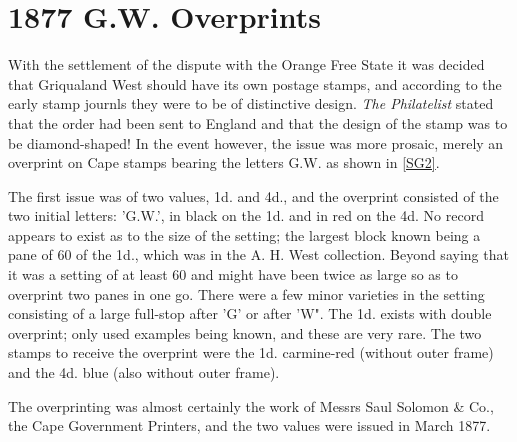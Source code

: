 \chapter{1877 G.W. Overprints}    

With the settlement of the dispute with the Orange Free State it was decided that Griqualand West should have its own postage stamps, and according to the early stamp journls they were to be of distinctive design. \textit{The Philatelist} stated that the order had been sent to England and that the design of the stamp was to be diamond-shaped! In the event however, the issue was more prosaic, merely an overprint on Cape stamps bearing the letters G.W. as shown in \ref{SG2}.


The first issue was of two values, 1d. and 4d., and the overprint consisted of the two initial letters: 'G.W.', in black on the 1d. and in red on the 4d. No record appears to exist as to the size of the setting; the largest block known being a pane of 60 of the 1d., which was in the A. H. West collection. Beyond saying that it was a setting of at least 60 and might have been twice as large so as to overprint two panes in one go. There were a few minor varieties in the setting consisting of a large full-stop after 'G' or after 'W". The 1d. exists with double overprint; only used examples being known, and these are very rare. The two stamps to receive the overprint were the 1d. carmine-red (without outer frame) and the 4d. blue (also without outer frame). 


The overprinting was almost certainly the work of Messrs Saul Solomon \& Co., the Cape Government Printers, and the two values were issued in March 1877.  

            
